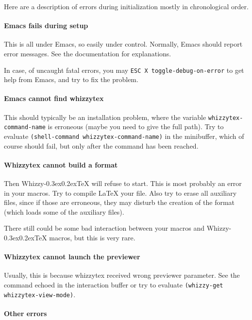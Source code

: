 \documentclass[12pt]{article}
\makeatletter
\let \lst \verb
\def \whizzy {{Whizzy\kern -0.3ex\raise 0.2ex\hbox{\let \@\relax\TeX}}}
\makeatother
\begin{document}
Here are a description of errors during initialization mostly in
chronological order. 

\paragraph {Emacs fails during setup}

This is all under Emacs, so easily under control.
Normally, Emacs should report error messages. See the documentation for
explanations. 

In case, of uncaught fatal errors, you may
\verb"ESC X toggle-debug-on-error" to get help from Emacs, and try to fix
the problem. 

\paragraph {Emacs cannot find whizzytex}

This should typically be an installation problem, where the variable
\lst"whizzytex-command-name" is erroneous (maybe you need to give the full
path). Try to evaluate \verb"(shell-command whizzytex-command-name)" in the
minibuffer, which of course should fail, but only after the command has been
reached.

\paragraph {Whizzytex cannot build a format}

Then {\whizzy} will refuse to start.  This is most probably an error in your
macros.  Try to compile {\LaTeX} your file.  
Also try to erase all auxiliary files, since if those are erroneous, they
may disturb the creation of the format (which loads some of the auxiliary
files). 

There still could be some bad interaction between your macros and {\whizzy}
macros, but this is very rare.

\paragraph {Whizzytex cannot launch the previewer}

Usually, this is because whizzytex received wrong previewer parameter.  See
the command echoed in the interaction buffer or try to evaluate
\lst"(whizzy-get whizzytex-view-mode)".

\paragraph {Other errors}
\end{document}
